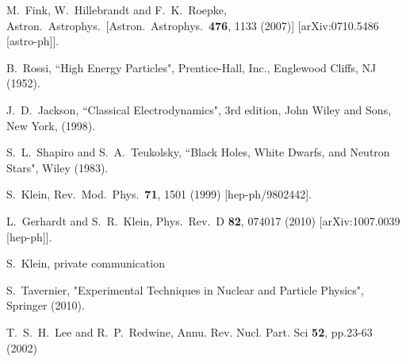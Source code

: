 \documentclass[twocolumn,preprintnumbers,amsmath,amssymb,prl, superscriptaddress]{revtex4}
\begin{document}
\begin{thebibliography}{99}
  M.~Fink, W.~Hillebrandt and F.~K.~Roepke,
  Astron.\ Astrophys.\ 
  [Astron.\ Astrophys.\  {\bf 476}, 1133 (2007)]
  [arXiv:0710.5486 [astro-ph]].


B.~Rossi, ``High Energy Particles", Prentice-Hall, Inc., Englewood Cliffs, NJ (1952). 

J.~D.~Jackson, ``Classical Electrodynamics", 3rd edition, John Wiley and Sons, New
York, (1998).

S.~L.~Shapiro and S.~A.~Teukolsky, ``Black Holes, White Dwarfs, and Neutron Stars", Wiley (1983).

  S.~Klein,
  Rev.\ Mod.\ Phys.\  {\bf 71}, 1501 (1999)
  [hep-ph/9802442].

  L.~Gerhardt and S.~R.~Klein,
  Phys.\ Rev.\ D {\bf 82}, 074017 (2010)
  [arXiv:1007.0039 [hep-ph]].

S.~Klein, private communication

S.~Tavernier, "Experimental Techniques in Nuclear and Particle Physics", Springer (2010). 

T.~S.~H.~Lee and R.~P.~Redwine,
 Annu. Rev. Nucl. Part. Sci {\bf 52}, pp.23-63 (2002)
  

\end{thebibliography}
\end{document}
